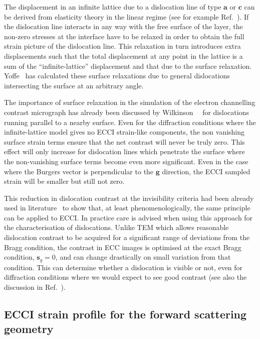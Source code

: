 The displacement in an infinite lattice due to a dislocation line of type $\mathbf{a}$ or $\mathbf{c}$ can be derived from elasticity theory in the linear regime (see for example Ref.~\cite{Read53}). If the dislocation line interacts in any way with the free surface of the layer, the non-zero stresses at the interface have to be relaxed in order to obtain the full strain picture of the dislocation line. This relaxation in turn introduces extra displacements such that the total displacement at any point in the lattice is a sum of the ``infinite-lattice'' displacement and that due to the surface relaxation. Yoffe~\cite{Yoffe} has calculated these surface relaxations due to general dislocations intersecting the surface at an arbitrary angle.

The importance of surface relaxation in the simulation of the electron channelling contrast micrograph has already been discussed by Wilkinson~\etal~\cite{Wilkinson95} for dislocations running parallel to a nearby surface. Even for the diffraction conditions where the infinite-lattice model gives no ECCI strain-like components, the non vanishing surface strain terms ensure that the net contrast will never be truly zero. This effect will only increase for dislocation lines which penetrate the surface where the non-vanishing surface terms become even more significant. Even in the case where the Burgers vector is perpendicular to the $\mathbf{g}$ direction, the ECCI sampled strain will be smaller but still not zero.

This reduction in dislocation contrast at the invisibility criteria had been already used in literature~\cite{Morin79, Crimp01} to show that, at least phenomenologically, the same principle can be applied to ECCI. In practice care is advised when using this approach for the characterisation of dislocations. Unlike TEM which allows reasonable dislocation contrast to be acquired for a significant range of deviations from the Bragg condition, the contrast in ECC images is optimised at the exact Bragg condition, $\mathbf{s}_g = 0$, and can change drastically on small variation from that condition. This can determine whether a dislocation is visible or not, even for diffraction conditions where we would expect to see good contrast (see also the discussion in Ref.~\cite{Crimp06}).


\subsection{ECCI strain profile for the forward scattering geometry}
\label{sec:tilteffect}

